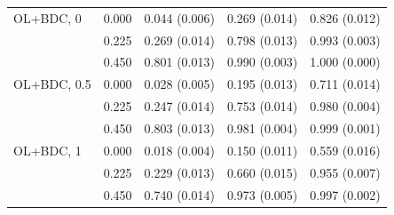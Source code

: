 \documentclass[
  11pt,
]{article}
\begin{document}
\begin{table}[H]
\begin{tabular}{llrrr}
\addlinespace
OL+BDC, 0 & 0.000 & 0.044 (0.006) & 0.269 (0.014) & 0.826 (0.012) \\
 & 0.225 & 0.269 (0.014) & 0.798 (0.013) & 0.993 (0.003) \\
 & 0.450 & 0.801 (0.013) & 0.990 (0.003) & 1.000 (0.000) \\
\addlinespace
OL+BDC, 0.5 & 0.000 & 0.028 (0.005) & 0.195 (0.013) & 0.711 (0.014) \\
 & 0.225 & 0.247 (0.014) & 0.753 (0.014) & 0.980 (0.004) \\
 & 0.450 & 0.803 (0.013) & 0.981 (0.004) & 0.999 (0.001) \\
\addlinespace
OL+BDC, 1 & 0.000 & 0.018 (0.004) & 0.150 (0.011) & 0.559 (0.016) \\
 & 0.225 & 0.229 (0.013) & 0.660 (0.015) & 0.955 (0.007) \\
 & 0.450 & 0.740 (0.014) & 0.973 (0.005) & 0.997 (0.002) \\
\bottomrule
\end{tabular}
\end{table}
\end{document}
